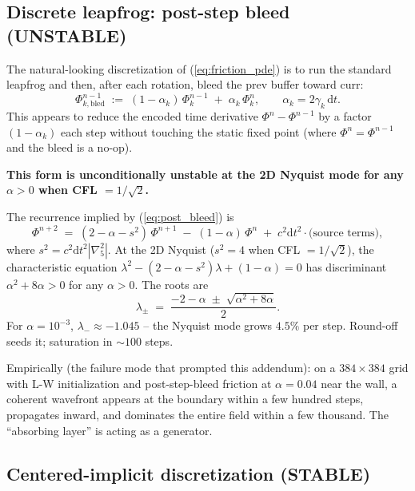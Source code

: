 \documentclass[11pt,a4paper]{article}
\newcommand{\dd}{\mathrm{d}}
\begin{document}
\subsection{Discrete leapfrog: post-step bleed (UNSTABLE)}

The natural-looking discretization of (\ref{eq:friction_pde}) is to
run the standard leapfrog and then, after each rotation, bleed the
prev buffer toward curr:
\begin{equation}
  \Phi^{n-1}_{k,\text{bled}} \;:=\; (1-\alpha_k)\,\Phi^{n-1}_k \;+\; \alpha_k\,\Phi^n_k,
  \qquad \alpha_k = 2\gamma_k\,\dd t.
  \label{eq:post_bleed}
\end{equation}
This appears to reduce the encoded time derivative $\Phi^n - \Phi^{n-1}$
by a factor $(1-\alpha_k)$ each step without touching the static
fixed point (where $\Phi^n = \Phi^{n-1}$ and the bleed is a no-op).

\textbf{This form is unconditionally unstable at the 2D Nyquist mode
for any $\alpha > 0$ when CFL $= 1/\sqrt{2}$.}

The recurrence implied by (\ref{eq:post_bleed}) is
\begin{equation}
  \Phi^{n+2} \;=\; (2 - \alpha - s^2)\,\Phi^{n+1} \;-\; (1-\alpha)\,\Phi^n
  \;+\; c^2\dd t^2 \cdot \text{(source terms)},
\end{equation}
where $s^2 = c^2 \dd t^2 |\nabla^2_5|$.  At the 2D Nyquist
($s^2 = 4$ when CFL $= 1/\sqrt{2}$), the characteristic equation
$\lambda^2 - (2-\alpha-s^2)\lambda + (1-\alpha) = 0$ has discriminant
$\alpha^2 + 8\alpha > 0$ for any $\alpha > 0$.  The roots are
\begin{equation}
  \lambda_{\pm} \;=\; \frac{-2 - \alpha \;\pm\; \sqrt{\alpha^2 + 8\alpha}}{2}.
\end{equation}
For $\alpha = 10^{-3}$, $\lambda_- \approx -1.045$ -- the Nyquist
mode grows $4.5\%$ per step.  Round-off seeds it; saturation in
$\sim 100$ steps.

Empirically (the failure mode that prompted this addendum): on a
$384 \times 384$ grid with L-W initialization and post-step-bleed
friction at $\alpha = 0.04$ near the wall, a coherent wavefront
appears at the boundary within a few hundred steps, propagates
inward, and dominates the entire field within a few thousand.  The
``absorbing layer'' is acting as a generator.

\subsection{Centered-implicit discretization (STABLE)}
\end{document}
